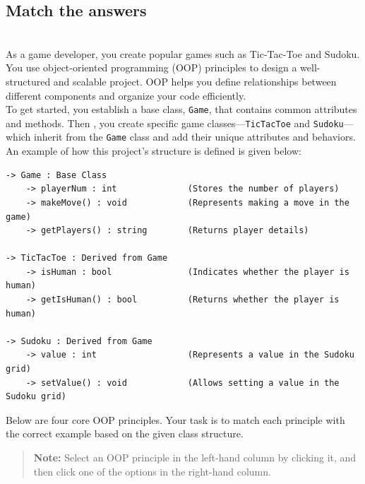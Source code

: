 

\subsection{Match the answers}\label{khiQy5hFp6HJMSGOolcSw}
\\
As a game developer, you create popular games such as Tic-Tac-Toe and Sudoku. You use object-oriented programming (OOP) principles to design a well-structured and scalable project. OOP helps you define relationships between different components and organize your code efficiently.
\\
To get started, you establish a base class, \texttt{Game}, that contains common attributes and methods. Then , you create specific game classes---\texttt{TicTacToe} and \texttt{Sudoku}---which inherit from the \texttt{Game} class and add their unique attributes and behaviors. An example of how this project's structure is defined is given below:

\begin{lstlisting}[language=plaintext]
-> Game : Base Class
    -> playerNum : int              (Stores the number of players)
    -> makeMove() : void            (Represents making a move in the game)
    -> getPlayers() : string        (Returns player details)

-> TicTacToe : Derived from Game
    -> isHuman : bool               (Indicates whether the player is human)
    -> getIsHuman() : bool          (Returns whether the player is human)

-> Sudoku : Derived from Game
    -> value : int                  (Represents a value in the Sudoku grid)
    -> setValue() : void            (Allows setting a value in the Sudoku grid)
\end{lstlisting}

Below are four core OOP principles. Your task is to match each principle with the correct example based on the given class structure.
\begin{quote}
\textbf{Note:} Select an OOP principle in the left-hand column by clicking it, and then click one of the options in the right-hand column.
\end{quote}

